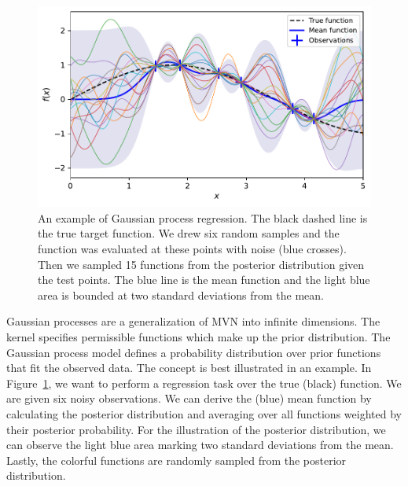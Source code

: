 \begin{figure}
    \centering
    \includegraphics[scale=0.8]{img/gaussian_process.pdf}
    \caption{An example of Gaussian process regression. The black dashed line is the true target function. We drew six random samples and the function was evaluated at these points with noise (blue crosses). Then we sampled 15 functions from the posterior distribution given the test points. The blue line is the mean function and the light blue area is bounded at two standard deviations from the mean.}
    \label{fig:f4}
\end{figure}

Gaussian processes are a generalization of MVN into infinite dimensions. The kernel specifies permissible functions which make up the prior distribution. The Gaussian process model defines a probability distribution over prior functions that fit the observed data. The concept is best illustrated in an example. In Figure~\ref{fig:f4}, we want to perform a regression task over the true (black) function. We are given six noisy observations. We can derive the (blue) mean function by calculating the posterior distribution and averaging over all functions weighted by their posterior probability. For the illustration of the posterior distribution, we can observe the light blue area marking two standard deviations from the mean. Lastly, the colorful functions are randomly sampled from the posterior distribution.

